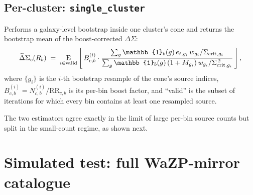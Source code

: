 \documentclass[11pt,a4paper]{article}
\newcommand{\DS}{\Delta\Sigma}
\newcommand{\Ex}{\operatorname{E}}
\begin{document}
\subsection{Per-cluster: \texttt{single\_cluster}}

Performs a galaxy-level bootstrap inside one cluster's cone and returns
the bootstrap mean of the boost-corrected $\DS$:
\begin{equation}
\widehat\DS_{c}(R_b)
\;=\;
\underset{i \in \mathrm{valid}}{\Ex}
\left[\,
  B_{c,b}^{(i)} \cdot
  \frac{
    \sum_g \mathbb{1}_b(g)\, e_{t,g_i}\, w_{g_i} / \Sigma_{{\rm crit},g_i}
  }{
    \sum_g \mathbb{1}_b(g)\, (1 + M_{g_i})\, w_{g_i} / \Sigma_{{\rm crit},g_i}^{\,2}
  }
\,\right],
\label{eq:single}
\end{equation}
where $\{g_i\}$ is the $i$-th bootstrap resample of the cone's source
indices, $B_{c,b}^{(i)} = N_{c,b}^{(i)} / \mathrm{RR}_{c,b}$ is its
per-bin boost factor, and ``valid'' is the subset of iterations for
which every bin contains at least one resampled source.

The two estimators agree exactly in the limit of large per-bin source
counts but split in the small-count regime, as shown next.


\section{Simulated test: full WaZP-mirror catalogue}
\label{sec:sim}
\end{document}
